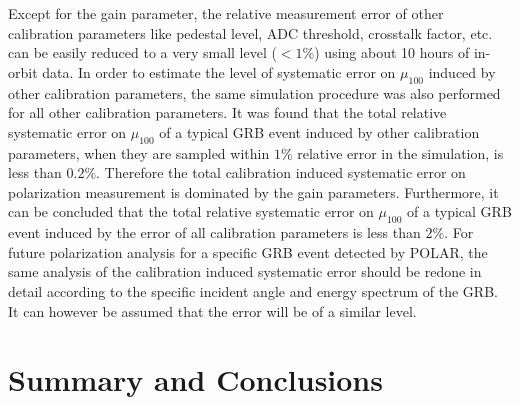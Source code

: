 \documentclass[preprint,sort&compress,12pt]{elsarticle}
\begin{document}
Except for the gain parameter, the relative measurement error of other calibration parameters like pedestal level, ADC threshold, crosstalk factor, etc. can be easily reduced to a very small level ($<1\%$) using about 10 hours of in-orbit data. In order to estimate the level of systematic error on $\mu_{100}$ induced by other calibration parameters, the same simulation procedure was also performed for all other calibration parameters. It was found that the total relative systematic error on $\mu_{100}$ of a typical GRB event induced by other calibration parameters, when they are sampled within $1\%$ relative error in the simulation, is less than $0.2\%$. Therefore the total calibration induced systematic error on polarization measurement is dominated by the gain parameters. Furthermore, it can be concluded that the total relative systematic error on $\mu_{100}$ of a typical GRB event induced by the error of all calibration parameters is less than $2\%$. For future polarization analysis for a specific GRB event detected by POLAR, the same analysis of the calibration induced systematic error should be redone in detail according to the specific incident angle and energy spectrum of the GRB. It can however be assumed that the error will be of a similar level.


\section{Summary and Conclusions}\label{sec:5}
\end{document}
